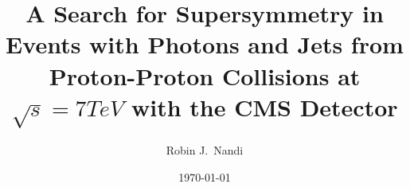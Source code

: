 \documentclass[a4paper]{report}
\begin{document}
\title{A Search for Supersymmetry in Events with Photons and Jets from 
Proton-Proton Collisions at $\sqrt{s} = 7 \unit{TeV}$ with the CMS Detector}
\author{Robin J.\ Nandi}
\date{\today}

\maketitle

\tableofcontents





















%
\end{document}
